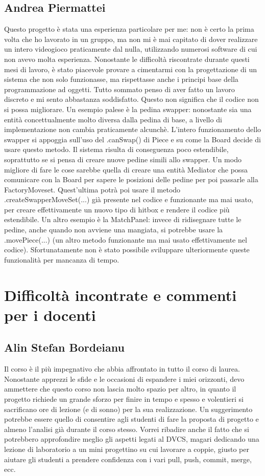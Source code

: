 \documentclass[a4paper,12pt]{report}
\begin{document}
\subsection{Andrea Piermattei}
Questo progetto è stata una esperienza particolare per me: non è certo la prima volta che ho lavorato in un gruppo, ma non mi è mai capitato di dover realizzare un intero videogioco praticamente dal nulla, utilizzando numerosi software di cui non avevo molta esperienza. 
Nonostante le difficoltà riscontrate durante questi mesi di lavoro, è stato piacevole provare a cimentarmi con la progettazione di un sistema che non solo funzionasse, ma rispettasse anche i principi base della programmazione ad oggetti.
Tutto sommato penso di aver fatto un lavoro discreto e mi sento abbastanza soddisfatto.
Questo non significa che il codice non si possa migliorare. Un esempio palese è la pedina swapper: nonostante sia una entità concettualmente molto diversa dalla pedina di base, a livello di implementazione non cambia praticamente alcunchè. L'intero funzionamento dello swapper si appoggia sull'uso del .canSwap() di Piece e su come la Board decide di usare questo metodo. Il sistema risulta di conseguenza poco estendibile, soprattutto se si pensa di creare nuove pedine simili allo swapper. Un modo migliore di fare le cose sarebbe quella di creare una entità Mediator che possa comunicare con la Board per sapere le posizioni delle pedine per poi passarle alla FactoryMoveset. Quest'ultima potrà poi usare il metodo .createSwapperMoveSet(...) già presente nel codice e funzionante ma mai usato, per creare effettivamente un nuovo tipo di hitbox e rendere il codice più estendibile. Un altro esempio è la MatchPanel: invece di ridisegnare tutte le pedine, anche quando non avviene una mangiata, si potrebbe usare la .movePiece(...) (un altro metodo funzionante ma mai usato effettivamente nel codice). Sfortunatamente non è stato possibile sviluppare ulteriormente queste funzionalità per mancanza di tempo.

\section{Difficoltà incontrate e commenti per i docenti}

\subsection{Alin Stefan Bordeianu}
Il corso è il più impegnativo che abbia affrontato in tutto il corso di laurea. Nonostante apprezzi le sfide e le occasioni di espandere i miei orizzonti, devo ammettere che questo corso non lascia molto spazio per altro, in quanto il progetto richiede un grande sforzo per finire in tempo e spesso e volentieri si sacrificano ore di lezione (e di sonno) per la sua realizzazione. Un suggerimento potrebbe essere quello di consentire agli studenti di fare la proposta di progetto e almeno l'analisi già durante il corso stesso. Vorrei ribadire anche il fatto che si potrebbero approfondire meglio gli aspetti legati al DVCS, magari dedicando una lezione di laboratorio a un mini progettino su cui lavorare a coppie, giusto per aiutare gli studenti a prendere confidenza con i vari pull, push, commit, merge, ecc.
\end{document}
